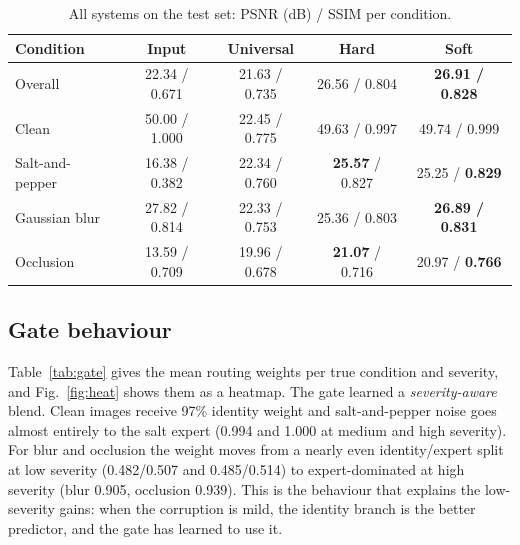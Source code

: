 \documentclass[conference]{IEEEtran}
\begin{document}
\begin{table}[t]
\centering
\caption{All systems on the test set: PSNR (dB) / SSIM per condition.}\label{tab:cmp}
\footnotesize\setlength{\tabcolsep}{3pt}
\begin{tabular}{@{}lcccc@{}}
\toprule
Condition & Input & Universal & Hard & Soft\\
\midrule
Overall & 22.34 / 0.671 & 21.63 / 0.735 & 26.56 / 0.804 & \textbf{26.91 / 0.828}\\
Clean & 50.00 / 1.000 & 22.45 / 0.775 & 49.63 / 0.997 & 49.74 / 0.999\\
Salt-and-pepper & 16.38 / 0.382 & 22.34 / 0.760 & \textbf{25.57} / 0.827 & 25.25 / \textbf{0.829}\\
Gaussian blur & 27.82 / 0.814 & 22.33 / 0.753 & 25.36 / 0.803 & \textbf{26.89 / 0.831}\\
Occlusion & 13.59 / 0.709 & 19.96 / 0.678 & \textbf{21.07} / 0.716 & 20.97 / \textbf{0.766}\\
\bottomrule
\end{tabular}
\end{table}

\subsection{Gate behaviour}
Table~\ref{tab:gate} gives the mean routing weights per true condition and severity, and Fig.~\ref{fig:heat} shows them as a heatmap. The gate learned a \emph{severity-aware} blend. Clean images receive 97\% identity weight and salt-and-pepper noise goes almost entirely to the salt expert (0.994 and 1.000 at medium and high severity). For blur and occlusion the weight moves from a nearly even identity/expert split at low severity (0.482/0.507 and 0.485/0.514) to expert-dominated at high severity (blur 0.905, occlusion 0.939). This is the behaviour that explains the low-severity gains: when the corruption is mild, the identity branch is the better predictor, and the gate has learned to use it.
\end{document}
